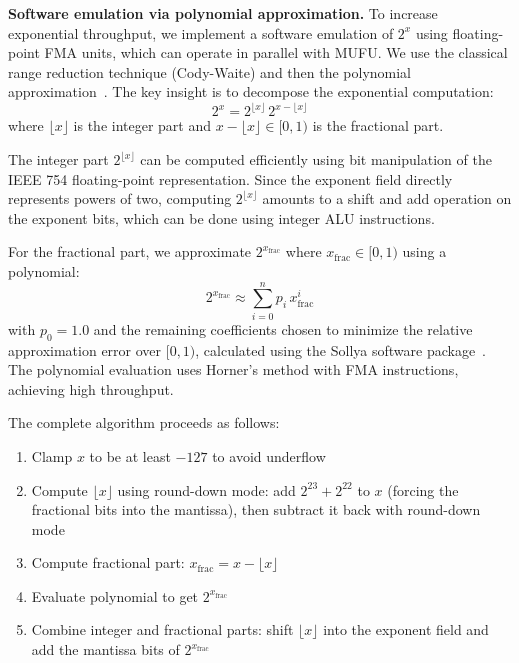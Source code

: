 \textbf{Software emulation via polynomial approximation.}
To increase exponential throughput, we implement a software emulation of $2^x$ using floating-point FMA units, which can operate in parallel with MUFU. We use the classical range reduction technique (Cody-Waite) and then the polynomial approximation~\citep{muller2018handbook}. The key insight is to decompose the exponential computation:
{\setlength{\abovedisplayskip}{2pt}%
 \setlength{\belowdisplayskip}{2pt}%
 \setlength{\abovedisplayshortskip}{3pt}%
 \setlength{\belowdisplayshortskip}{3pt}%
\begin{equation}
2^x = 2^{\lfloor x \rfloor}\,2^{x-\lfloor x \rfloor}
\end{equation}}
where $\lfloor x \rfloor$ is the integer part and $x - \lfloor x \rfloor \in [0, 1)$ is the fractional part.

The integer part $2^{\lfloor x \rfloor}$ can be computed efficiently using bit manipulation of the IEEE 754 floating-point representation. Since the exponent field directly represents powers of two, computing $2^{\lfloor x \rfloor}$ amounts to a shift and add operation on the exponent bits, which can be done using integer ALU instructions.

For the fractional part, we approximate $2^{x_{\text{frac}}}$ where $x_{\text{frac}} \in [0, 1)$ using a polynomial:
\begin{equation}
2^{x_{\text{frac}}} \approx \sum_{i=0}^{n} p_i\, x_{\text{frac}}^i
\end{equation}
with $p_0 = 1.0$ and the remaining coefficients chosen to minimize the relative approximation error over $[0, 1)$, calculated using the Sollya software package~\citep{chevillard2010sollya}. The polynomial evaluation uses Horner's method with FMA instructions, achieving high throughput.

The complete algorithm proceeds as follows:
\begin{enumerate}
\item Clamp $x$ to be at least $-127$ to avoid underflow
\item Compute $\lfloor x \rfloor$ using round-down mode: add $2^{23} + 2^{22}$ to $x$ (forcing the fractional bits into the mantissa), then subtract it back with round-down mode
\item Compute fractional part: $x_{\text{frac}} = x - \lfloor x \rfloor$
\item Evaluate polynomial to get $2^{x_{\text{frac}}}$
\item Combine integer and fractional parts: shift $\lfloor x \rfloor$ into the exponent field and add the mantissa bits of $2^{x_{\text{frac}}}$
\end{enumerate}

